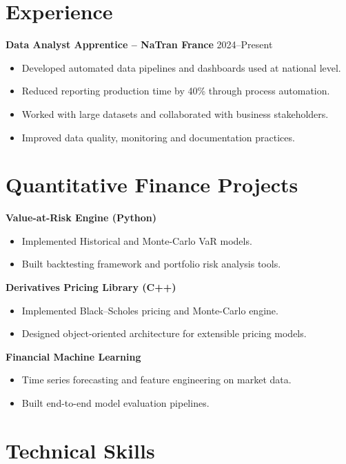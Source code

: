 \documentclass[10pt, letterpaper]{article}
\begin{document}
\section*{Experience}

\textbf{Data Analyst Apprentice – NaTran France} \hfill 2024–Present
\begin{itemize}[leftmargin=0.5cm]
\item Developed automated data pipelines and dashboards used at national level.
\item Reduced reporting production time by 40\% through process automation.
\item Worked with large datasets and collaborated with business stakeholders.
\item Improved data quality, monitoring and documentation practices.
\end{itemize}

\section*{Quantitative Finance Projects}

\textbf{Value-at-Risk Engine (Python)}
\begin{itemize}[leftmargin=0.5cm]
\item Implemented Historical and Monte-Carlo VaR models.
\item Built backtesting framework and portfolio risk analysis tools.
\end{itemize}

\textbf{Derivatives Pricing Library (C++)}
\begin{itemize}[leftmargin=0.5cm]
\item Implemented Black–Scholes pricing and Monte-Carlo engine.
\item Designed object-oriented architecture for extensible pricing models.
\end{itemize}

\textbf{Financial Machine Learning}
\begin{itemize}[leftmargin=0.5cm]
\item Time series forecasting and feature engineering on market data.
\item Built end-to-end model evaluation pipelines.
\end{itemize}

\section*{Technical Skills}
\end{document}
